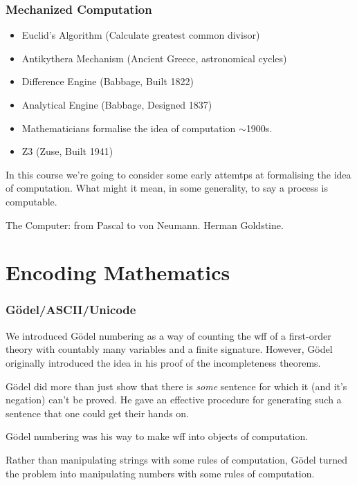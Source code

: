 \documentclass{beamer}
\begin{document}
\begin{frame}
	\frametitle{Mechanized Computation}

	\begin{itemize}
		\item Euclid's Algorithm (Calculate greatest common divisor)
		\item Antikythera Mechanism (Ancient Greece, astronomical cycles)
		\item Difference Engine (Babbage, Built 1822)
		\item Analytical Engine (Babbage, Designed 1837)
		\item Mathematicians formalise the idea of computation $\sim$1900s.
		\item Z3 (Zuse, Built 1941)
	\end{itemize}

	\vspace{0.5cm}

	In this course we're going to consider some early attemtps at formalising the idea of computation. What might it mean, in some generality, to say a process is computable.  

	\vspace{0.5cm}

	The Computer: from Pascal to von Neumann. Herman Goldstine.

\end{frame}

\section{Encoding Mathematics}

\begin{frame}
	\frametitle{G\"{o}del/ASCII/Unicode}

	We introduced G\"{o}del numbering as a way of counting the wff of a first-order theory with countably many variables and a finite signature. However, G\"{o}del originally introduced the idea in his proof of the incompleteness theorems. 

	\vspace{0.5cm}

	G\"{o}del did more than just show that there is \emph{some} sentence for which it (and it's negation) can't be proved. He gave an effective procedure for generating such a sentence that one could get their hands on. 

	\vspace{0.5cm}

	G\"{o}del numbering was his way to make wff into objects of computation.

	\vspace{0.5cm}

	Rather than manipulating strings with some rules of computation, G\"{o}del turned the problem into manipulating numbers with some rules of computation.
\end{frame}
\end{document}

